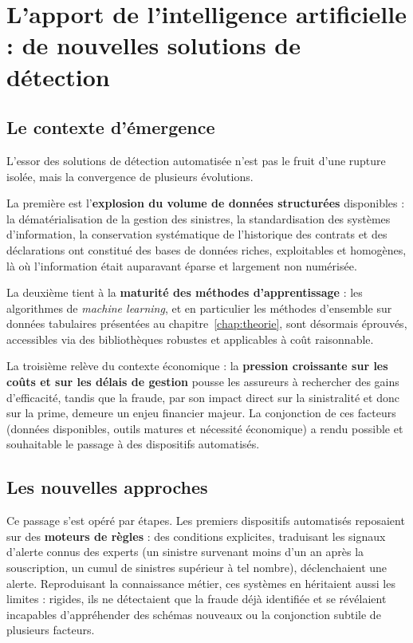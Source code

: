 \section{L'apport de l'intelligence artificielle : de nouvelles solutions de détection}


\subsection{Le contexte d'émergence}

L'essor des solutions de détection automatisée n'est pas le fruit d'une rupture isolée, mais la convergence de plusieurs évolutions.

La première est l'\textbf{explosion du volume de données structurées} disponibles : la dématérialisation de la gestion des sinistres, la standardisation des systèmes d'information, la conservation systématique de l'historique des contrats et des déclarations ont constitué des bases de données riches, exploitables et homogènes, là où l'information était auparavant éparse et largement non numérisée.

La deuxième tient à la \textbf{maturité des méthodes d'apprentissage} : les algorithmes de \textit{machine learning}, et en particulier les méthodes d'ensemble sur données tabulaires présentées au chapitre~\ref{chap:theorie}, sont désormais éprouvés, accessibles via des bibliothèques robustes et applicables à coût raisonnable.

La troisième relève du contexte économique : la \textbf{pression croissante sur les coûts et sur les délais de gestion} pousse les assureurs à rechercher des gains d'efficacité, tandis que la fraude, par son impact direct sur la sinistralité et donc sur la prime, demeure un enjeu financier majeur. La conjonction de ces facteurs (données disponibles, outils matures et nécessité économique) a rendu possible et souhaitable le passage à des dispositifs automatisés.

\subsection{Les nouvelles approches}

Ce passage s'est opéré par étapes. Les premiers dispositifs automatisés reposaient sur des \textbf{moteurs de règles} : des conditions explicites, traduisant les signaux d'alerte connus des experts (un sinistre survenant moins d'un an après la souscription, un cumul de sinistres supérieur à tel nombre), déclenchaient une alerte. Reproduisant la connaissance métier, ces systèmes en héritaient aussi les limites : rigides, ils ne détectaient que la fraude déjà identifiée et se révélaient incapables d'appréhender des schémas nouveaux ou la conjonction subtile de plusieurs facteurs.


